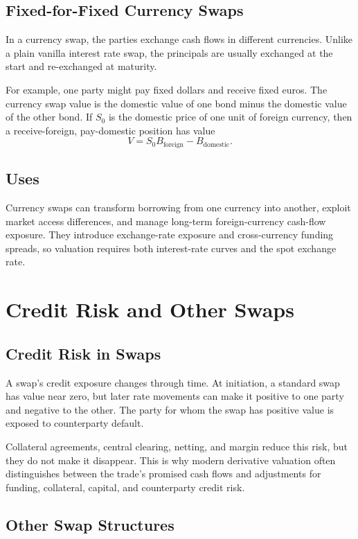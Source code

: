 \subsection{Fixed-for-Fixed Currency Swaps}

In a currency swap, the parties exchange cash flows in different currencies.
Unlike a plain vanilla interest rate swap, the principals are usually exchanged
at the start and re-exchanged at maturity.

For example, one party might pay fixed dollars and receive fixed euros. The
currency swap value is the domestic value of one bond minus the domestic value
of the other bond. If $S_0$ is the domestic price of one unit of foreign
currency, then a receive-foreign, pay-domestic position has value
\[
    V=S_0 B_{\text{foreign}}-B_{\text{domestic}}.
\]

\subsection{Uses}

Currency swaps can transform borrowing from one currency into another, exploit
market access differences, and manage long-term foreign-currency cash-flow
exposure. They introduce exchange-rate exposure and cross-currency funding
spreads, so valuation requires both interest-rate curves and the spot exchange
rate.

\section{Credit Risk and Other Swaps}

\subsection{Credit Risk in Swaps}

A swap's credit exposure changes through time. At initiation, a standard swap
has value near zero, but later rate movements can make it positive to one party
and negative to the other. The party for whom the swap has positive value is
exposed to counterparty default.

Collateral agreements, central clearing, netting, and margin reduce this risk,
but they do not make it disappear. This is why modern derivative valuation often
distinguishes between the trade's promised cash flows and adjustments for
funding, collateral, capital, and counterparty credit risk.

\subsection{Other Swap Structures}

